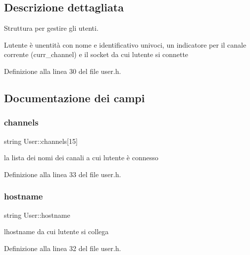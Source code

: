 \subsection{Descrizione dettagliata}
Struttura per gestire gli utenti. 

L\textquotesingle{}utente è un\textquotesingle{}entità con nome e identificativo univoci, un indicatore per il canale corrente (curr\+\_\+channel) e il socket da cui l\textquotesingle{}utente si connette 

Definizione alla linea 30 del file user.\+h.



\subsection{Documentazione dei campi}
\mbox{\label{structUser_a9a7de05da34bb5f91e9e85a396a86462}} 
\subsubsection{\texorpdfstring{channels}{channels}}
{\footnotesize\ttfamily string User\+::channels\mbox{[}15\mbox{]}}



la lista dei nomi dei canali a cui l\textquotesingle{}utente è connesso 



Definizione alla linea 33 del file user.\+h.

\mbox{\label{structUser_a3d93ac6426bd7cf28311701e86fcafc0}} 
\subsubsection{\texorpdfstring{hostname}{hostname}}
{\footnotesize\ttfamily string User\+::hostname}



l\textquotesingle{}hostname da cui l\textquotesingle{}utente si collega 



Definizione alla linea 32 del file user.\+h.

\mbox{\label{structUser_aa7e6e39b43020bbe9c3a196b3689b0f7}} 
